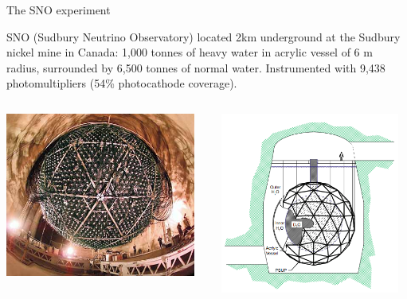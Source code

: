 \begin{frame}[t]{The SNO experiment}

{\small
SNO (Sudbury Neutrino Observatory) located 2km underground
at the Sudbury nickel mine in Canada:
1,000 tonnes of heavy water in acrylic vessel of 6 m radius,
surrounded by 6,500 tonnes of normal water.
Instrumented with 9,438 photomultipliers (54\% photocathode coverage).
}
\begin{columns}
  \begin{column}{0.50\textwidth}
     \includegraphics[width=0.95\textwidth]{./images/3nu/solar/sno_detector_photo.jpg}\\
  \end{column}
  \begin{column}{0.50\textwidth}
     \includegraphics[width=0.95\textwidth]{./images/3nu/solar/sno_detector_schematic.png}\\
  \end{column}
\end{columns}
\end{frame}

